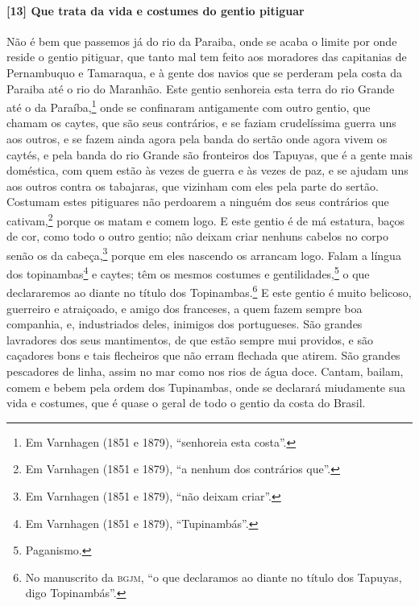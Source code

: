 \paragraph{[13] Que trata da vida e costumes do gentio pitiguar} \quad
Não é bem que passemos já do rio da Paraiba, onde se acaba o limite por onde reside o
gentio pitiguar, que tanto mal tem feito aos moradores das capitanias de Pernambuquo e
Tamaraqua, e à gente dos navios que se perderam pela costa da Paraiba até o rio do
Maranhão. Este gentio senhoreia esta terra do rio Grande até o da Paraíba,\footnote{ Em
Varnhagen (1851 e 1879), ``senhoreia esta costa''.} onde se confinaram antigamente com
outro gentio, que chamam os caytes, que são seus contrários, e se faziam crudelíssima
guerra uns aos outros, e se fazem ainda agora pela banda do sertão onde agora vivem os
caytés, e pela banda do rio Grande são fronteiros dos Tapuyas, que é a gente mais
doméstica, com quem estão às vezes de guerra e às vezes de paz, e se ajudam uns aos outros
contra os tabajaras, que vizinham com eles pela parte do sertão. Costumam estes pitiguares
não perdoarem a ninguém dos seus contrários que cativam,\footnote{ Em Varnhagen (1851 e
1879), ``a nenhum dos contrários que''.} porque os matam e comem logo. E este gentio é de
má estatura, baços de cor, como todo o outro gentio; não deixam criar nenhuns cabelos no
corpo senão os da cabeça,\footnote{ Em Varnhagen (1851 e 1879), ``não deixam criar''.}
porque em eles nascendo os arrancam logo. Falam a língua dos topinambas\footnote{ Em
Varnhagen (1851 e 1879), ``Tupinambás''.} e caytes; têm os mesmos costumes e
gentilidades,\footnote{ Paganismo.} o que declararemos ao diante no título dos
Topinambas.\footnote{ No manuscrito da \textsc{bgjm}, ``o que declaramos ao diante no
título dos Tapuyas, digo Topinambás''.} E este gentio é muito belicoso, guerreiro e
atraiçoado, e amigo dos franceses, a quem fazem sempre boa companhia, e, industriados
deles, inimigos dos portugueses. São grandes lavradores dos seus mantimentos, de que estão
sempre mui providos, e são caçadores bons e tais flecheiros que não erram flechada que
atirem. São grandes pescadores de linha, assim no mar como nos rios de água doce. Cantam,
bailam, comem e bebem pela ordem dos Tupinambas, onde se declarará miudamente sua vida e
costumes, que é quase o geral de todo o gentio da costa do Brasil.

